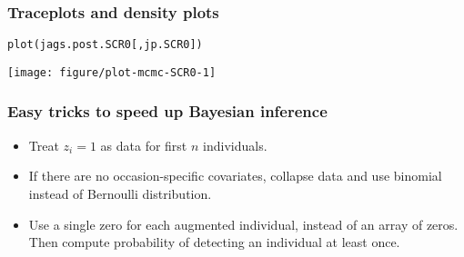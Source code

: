\documentclass[color=usenames,dvipsnames]{beamer}\usepackage[]{graphicx}\usepackage[]{color}
\makeatletter
\newcommand{\hlstd}[1]{\textcolor[rgb]{0,0,0}{#1}}%
\newcommand{\hlkwd}[1]{\textcolor[rgb]{0.004,0.004,0.506}{#1}}%
\newenvironment{kframe}{%
 \def\at@end@of@kframe{}%
 \ifinner\ifhmode%
  \def\at@end@of@kframe{\end{minipage}}%
  \begin{minipage}{\columnwidth}%
 \fi\fi%
 \def\FrameCommand##1{\hskip\@totalleftmargin \hskip-\fboxsep
 \colorbox{shadecolor}{##1}\hskip-\fboxsep
     \hskip-\linewidth \hskip-\@totalleftmargin \hskip\columnwidth}%
 \MakeFramed {\advance\hsize-\width
   \@totalleftmargin\z@ \linewidth\hsize
   \@setminipage}}%
 {\par\unskip\endMakeFramed%
 \at@end@of@kframe}
\newenvironment{knitrout}{}{} %
\makeatother
\begin{document}
\begin{frame}[fragile]
  \frametitle{Traceplots and density plots}
\begin{knitrout}\footnotesize
{}\color{fgcolor}\begin{kframe}
\begin{alltt}
\hlkwd{plot}\hlstd{(jags.post.SCR0[,jp.SCR0])}
\end{alltt}
\end{kframe}

{\centering \texttt{[image: figure/plot-mcmc-SCR0-1]} 

}


\end{knitrout}
\end{frame}


\begin{frame}
  \frametitle{Easy tricks to speed up Bayesian inference}
  \begin{itemize}
    \item Treat $z_i=1$ as data for first $n$ individuals.
    \item If there are no occasion-specific covariates, collapse data
      and use binomial instead of Bernoulli distribution.
    \item Use a single zero for each augmented individual, instead of
      an array of zeros. Then compute probability of detecting an
      individual at least once.
  \end{itemize}
\end{frame}
\end{document}
